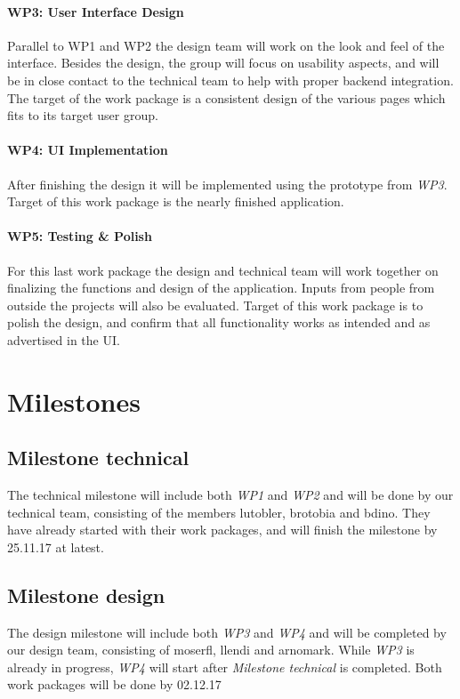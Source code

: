\documentclass{report}
\begin{document}
\paragraph{WP3: User Interface Design}
Parallel to WP1 and WP2 the design team will work on the look and feel of the interface. 
Besides the design, the group will focus on usability aspects, and will be in close
contact to the technical team to help with proper backend integration. 
The target of the work package is a consistent design of the various pages which 
fits to its target user group.

\paragraph{WP4: UI Implementation}
After finishing the design it will be implemented using the prototype from \emph{WP3}.
Target of this work package is the nearly finished application.

\paragraph{WP5: Testing \& Polish}
For this last work package the design and technical team will work together
on finalizing the functions and design of the application. Inputs from people from outside 
the projects will also be evaluated. Target of this work package is to polish the design,
and confirm that all functionality works as intended and as advertised in the UI.
\newpage
\section{Milestones}

\subsection{Milestone technical}
The technical milestone will include both \emph{WP1} and \emph{WP2} and will be done by our technical team,
consisting of the members lutobler, brotobia and bdino.
They have already started with their work packages, and will finish the milestone by 25.11.17 at latest.

\subsection{Milestone design}
The design milestone will include both \emph{WP3} and \emph{WP4} and will be completed by our design team, 
consisting of moserfl, llendi and arnomark. While \emph{WP3} is already in progress, \emph{WP4} will start
after \emph{Milestone technical} is completed. Both work packages will be done by 02.12.17
\end{document}
